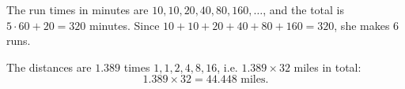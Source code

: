 The run times in minutes are $10,10,20,40,80,160,\dots$, and the total is $5\cdot60+20=320$ minutes. Since $10+10+20+40+80+160=320$, she makes $6$ runs.

The distances are $1.389$ times $1,1,2,4,8,16$, i.e. $1.389\times32$ miles in total:
\[1.389\times32=\boxed{44.448}\text{ miles}.\]
